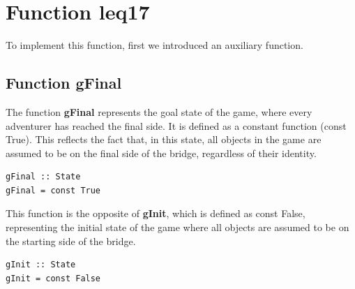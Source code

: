 \documentclass[a4paper,12pt]{report}
\begin{document}
\section{Function leq17}
To implement this function, first we introduced an auxiliary function.
\subsection{Function gFinal}
The function \textbf{gFinal} represents the goal state of the game,
where every adventurer has reached the final side. It is defined as a
constant function (const True). This reflects the fact that, in this state,
all objects in the game are assumed to be on the final side of the bridge,
regardless of their identity.
\begin{verbatim}
gFinal :: State
gFinal = const True
\end{verbatim}
This function is the opposite of \textbf{gInit}, which is defined as const False,
representing the initial state of the game where all objects are assumed
to be on the starting side of the bridge.
\begin{verbatim}
gInit :: State
gInit = const False
\end{verbatim}
\end{document}
